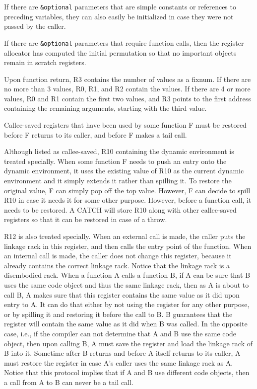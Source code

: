 If there are \texttt{\&optional} parameters that are simple constants or
references to preceding variables, they can also easily be
initialized in case they were not passed by the caller. 

If there are \texttt{\&optional} parameters that require function calls, then
the register allocator has computed the initial permutation so that no
important objects remain in scratch registers.  

Upon function return, R3 contains the number of values as a fixnum.
If there are no more than 3 values, R0, R1, and R2 contain the
values. If there are 4 or more values, R0 and R1 contain the first two
values, and R3 points to the first address containing the remaining
arguments, starting with the third value.

Callee-saved registers that have been used by some function F must be
restored before F returns to its caller, and before F makes a tail
call.

Although listed as callee-saved, R10 containing the dynamic
environment is treated specially.  When some function F needs to push
an entry onto the dynamic environment, it uses the existing value of
R10 as the current dynamic environment and it simply extends it rather
than spilling it.  To restore the original value, F can simply pop off
the top value.  However, F can decide to spill R10 in case it needs it
for some other purpose.  However, before a function call, it needs to
be restored.  A CATCH will store R10 along with other callee-saved
registers so that it can be restored in case of a throw.

R12 is also treated specially.  When an external call is made, the
caller puts the linkage rack in this register, and then calls the
entry point of the function.  When an internal call is made, the
caller does not change this register, because it already contains the
correct linkage rack.  Notice that the linkage rack is a
disembodied rack.  When a function A calls a function B, if
A can be sure that B uses the same code object and thus the same
linkage rack, then as A is about to call B, A makes sure that this
register contains the same value as it did upon entry to A.  It can do
that either by not using the register for any other purpose, or by
spilling it and restoring it before the call to B.  B guarantees that
the register will contain the same value as it did when B was called.
In the opposite case, i.e., if the compiler can not determine that A
and B use the same code object, then upon calling B, A must save the
register and load the linkage rack of B into it.  Sometime after B
returns and before A itself returns to its caller, A must restore the
register in case A's caller uses the same linkage rack as A.  Notice
that this protocol implies that if A and B use different code objects,
then a call from A to B can never be a tail call.%

